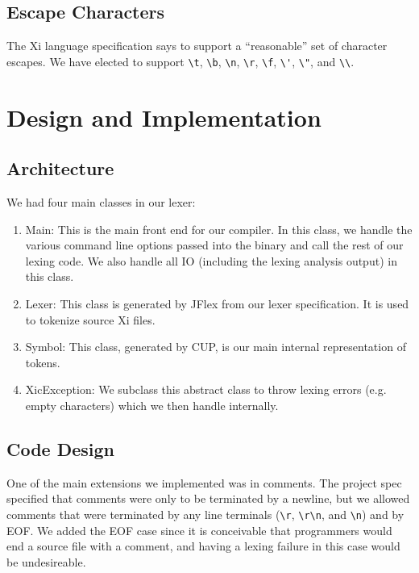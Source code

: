 \documentclass{hw}
\begin{document}
\subsection{Escape Characters}
The Xi language specification says to support a ``reasonable'' set of character
escapes. We have elected to support \verb$\t$, \verb$\b$, \verb$\n$, \verb$\r$,
\verb$\f$, \verb$\'$, \verb$\"$, and \verb$\\$.


\section{Design and Implementation}\label{sec:design}
\subsection{Architecture}
We had four main classes in our lexer:
\begin{enumerate}
  \item{Main:} This is the main front end for our compiler. In this class, we
  handle the various command line options passed into the binary and call the
  rest of our lexing code. We also handle all IO (including the lexing analysis
  output) in this class.

  \item{Lexer:} This class is generated by JFlex from our lexer specification.
  It is used to tokenize source Xi files.

  \item{Symbol:} This class, generated by CUP, is our main internal representation
  of tokens.

  \item{XicException:} We subclass this abstract class to throw lexing errors (e.g.
  empty characters) which we then handle internally.
\end{enumerate}
\subsection{Code Design}
One of the main extensions we implemented was in comments. The project spec specified that
comments were only to be terminated by a newline, but we allowed comments that were
terminated by any line terminals (\verb$\r$, \verb$\r\n$, and \verb$\n$) and by EOF.
We added the EOF case since it is conceivable that programmers would end a source file
with a comment, and having a lexing failure in this case would be undesireable. 
\end{document}
